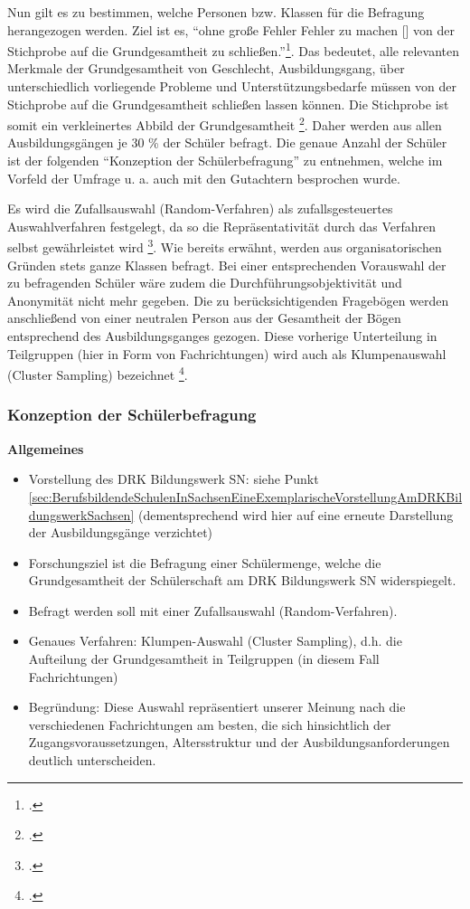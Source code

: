 Nun gilt es zu bestimmen, welche Personen bzw. Klassen für die Befragung herangezogen werden. Ziel ist es, "`ohne große Fehler Fehler zu machen [\punkte] von der Stichprobe auf die Grundgesamtheit zu schließen."'\footcite[60]{Mayer2013}. Das bedeutet, alle relevanten Merkmale der Grundgesamtheit von Geschlecht, Ausbildungsgang, über unterschiedlich vorliegende Probleme und Unterstützungsbedarfe müssen von der Stichprobe auf die Grundgesamtheit schließen lassen können. Die Stichprobe ist somit ein verkleinertes Abbild der Grundgesamtheit \footcite [vgl.][197]{Kromrey1995}. Daher werden aus allen Ausbildungsgängen je 30 \% der Schüler befragt. Die genaue Anzahl der Schüler ist der folgenden "`Konzeption der Schülerbefragung"' zu entnehmen, welche im Vorfeld der Umfrage u. a. auch mit den Gutachtern besprochen wurde.

Es wird die Zufallsauswahl (Random-Verfahren) als zufallsgesteuertes Auswahlverfahren festgelegt, da so die Repräsentativität durch das Verfahren selbst gewährleistet wird \footcite[vgl.][60]{Mayer2013}. Wie bereits erwähnt, werden aus organisatorischen Gründen stets ganze Klassen befragt. Bei einer entsprechenden Vorauswahl der zu befragenden Schüler wäre zudem die Durchführungsobjektivität und Anonymität nicht mehr gegeben. Die zu berücksichtigenden Fragebögen werden anschließend von einer neutralen Person aus der Gesamtheit der Bögen entsprechend des Ausbildungsganges gezogen. Diese vorherige Unterteilung in Teilgruppen (hier in Form von Fachrichtungen) wird auch als Klumpenauswahl (Cluster Sampling) bezeichnet \footcite[vgl.][63]{Mayer2013}.

\subsubsection{Konzeption der Schülerbefragung}
\label{sec:KonzeptionDerSchülerbefragung}

\textbf{Allgemeines}
\begin{itemize}
	\item Vorstellung des DRK Bildungswerk SN: siehe Punkt \ref{sec:BerufsbildendeSchulenInSachsenEineExemplarischeVorstellungAmDRKBildungswerkSachsen} (dementsprechend wird hier auf eine erneute Darstellung der Ausbildungsgänge verzichtet)
	\item Forschungsziel ist die Befragung einer Schülermenge, welche die Grundgesamtheit der Schülerschaft am DRK Bildungswerk SN widerspiegelt.
	\item Befragt werden soll mit einer Zufallsauswahl (Random-Verfahren).
	\item Genaues Verfahren: Klumpen-Auswahl (Cluster Sampling), d.h. die Aufteilung der Grundgesamtheit in Teilgruppen (in diesem Fall Fachrichtungen) 
	\item Begründung: Diese Auswahl repräsentiert unserer Meinung nach die verschiedenen Fachrichtungen am besten, die sich hinsichtlich der Zugangsvoraussetzungen, Altersstruktur und der Ausbildungsanforderungen deutlich unterscheiden.
\end{itemize}

